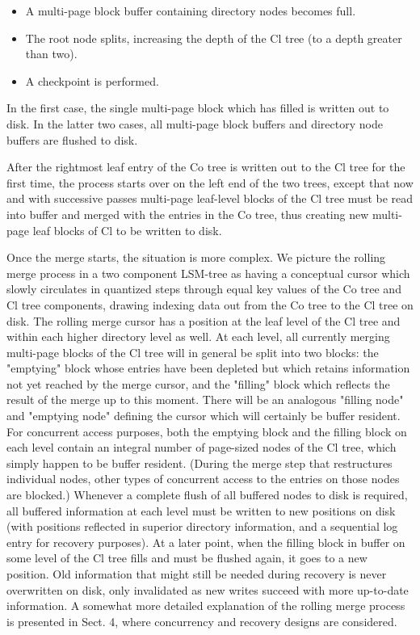 \documentclass[a4paper,11pt,notitlepage,twoside,openright]{article}
\begin{document}
\begin{itemize}
\item
  A multi-page block buffer containing directory nodes becomes full.
\item
  The root node splits, increasing the depth of the Cl tree (to a depth
  greater than two).
\item
  A checkpoint is performed.
\end{itemize}


In the first case, the single multi-page block which has filled is
written out to disk. In the latter two cases, all multi-page block
buffers and directory node buffers are flushed to disk.

After the rightmost leaf entry of the Co tree is written out to the Cl
tree for the first time, the process starts over on the left end of the
two trees, except that now and with successive passes multi-page
leaf-level blocks of the Cl tree must be read into buffer and merged
with the entries in the Co tree, thus creating new multi-page leaf
blocks of Cl to be written to disk.

Once the merge starts, the situation is more complex. We picture the
rolling merge process in a two component LSM-tree as having a conceptual
cursor which slowly circulates in quantized steps through equal key
values of the Co tree and Cl tree components, drawing indexing data out
from the Co tree to the Cl tree on disk. The rolling merge cursor has a
position at the leaf level of the Cl tree and within each higher
directory level as well. At each level, all currently merging multi-page
blocks of the Cl tree will in general be split into two blocks: the
"emptying" block whose entries have been depleted but which retains
information not yet reached by the merge cursor, and the "filling" block
which reflects the result of the merge up to this moment. There will be
an analogous "filling node" and "emptying node" defining the cursor
which will certainly be buffer resident. For concurrent access purposes,
both the emptying block and the filling block on each level contain an
integral number of page-sized nodes of the Cl tree, which simply happen
to be buffer resident. (During the merge step that restructures
individual nodes, other types of concurrent access to the entries on
those nodes are blocked.) Whenever a complete flush of all buffered
nodes to disk is required, all buffered information at each level must
be written to new positions on disk (with positions reflected in
superior directory information, and a sequential log entry for recovery
purposes). At a later point, when the filling block in buffer on some
level of the Cl tree fills and must be flushed again, it goes to a new
position. Old information that might still be needed during recovery is
never overwritten on disk, only invalidated as new writes succeed with
more up-to-date information. A somewhat more detailed explanation of the
rolling merge process is presented in Sect. 4, where concurrency and
recovery designs are considered.
\end{document}
